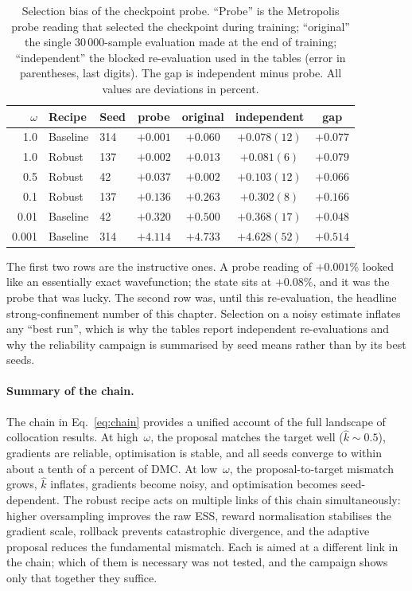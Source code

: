 \begin{table}[htbp]
  \centering
  \caption[Selection bias of the checkpoint probe]{Selection bias of the checkpoint probe.
  ``Probe'' is the Metropolis probe reading that selected the checkpoint during training;
  ``original'' the single $30\,000$-sample evaluation made at the end of training;
  ``independent'' the blocked re-evaluation used in the tables (error in parentheses, last
  digits). The gap is independent minus probe. All values are deviations in percent.}
  \label{tab:vmc-gap}
  \small
  \begin{tabular}{r l l cccc}
    \toprule
    $\omega$ & Recipe & Seed & probe & original & independent & gap \\
    \midrule
    1.0   & Baseline & 314 & $+0.001$ & $+0.060$ & $+0.078(12)$ & $+0.077$ \\
    1.0   & Robust   & 137 & $+0.002$ & $+0.013$ & $+0.081(6)$  & $+0.079$ \\
    0.5   & Robust   & 42  & $+0.037$ & $+0.002$ & $+0.103(12)$ & $+0.066$ \\
    0.1   & Robust   & 137 & $+0.136$ & $+0.263$ & $+0.302(8)$  & $+0.166$ \\
    0.01  & Baseline & 42  & $+0.320$ & $+0.500$ & $+0.368(17)$ & $+0.048$ \\
    0.001 & Baseline & 314 & $+4.114$ & $+4.733$ & $+4.628(52)$ & $+0.514$ \\
    \bottomrule
  \end{tabular}
\end{table}

The first two rows are the instructive ones. A probe reading of $+0.001\%$ looked like an
essentially exact wavefunction; the state sits at $+0.08\%$, and it was the probe that was
lucky. The second row was, until this re-evaluation, the headline strong-confinement number
of this chapter. Selection on a noisy estimate inflates any ``best run'', which is why the
tables report independent re-evaluations and why the reliability campaign is summarised by
seed means rather than by its best seeds.

\paragraph{Summary of the chain.}
The chain in Eq.~\eqref{eq:chain} provides a unified account of
the full landscape of collocation results.
At high~$\omega$, the proposal matches the target well
($\hat{k}\sim 0.5$), gradients are reliable, optimisation is
stable, and all seeds converge to within about a tenth of a percent of DMC.
At low~$\omega$, the proposal-to-target mismatch grows, $\hat{k}$
inflates, gradients become noisy, and optimisation becomes seed-dependent.
The robust recipe acts on multiple links of this chain simultaneously:
higher oversampling improves the raw ESS, reward normalisation
stabilises the gradient scale, rollback prevents catastrophic
divergence, and the adaptive proposal reduces the fundamental
mismatch.
Each is aimed at a different link in the chain; which of them is necessary was not tested,
and the campaign shows only that together they suffice.
